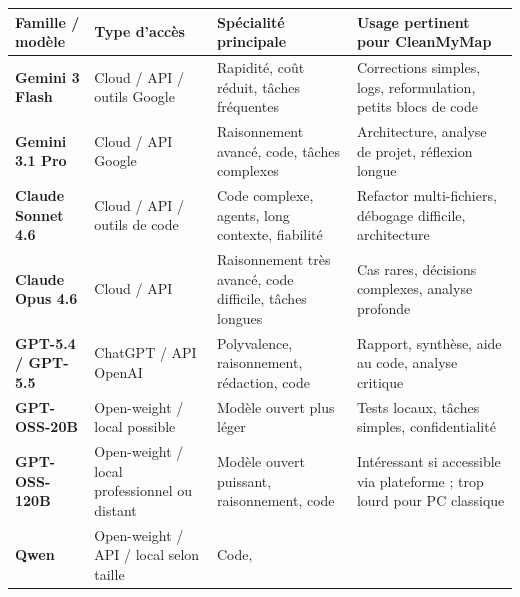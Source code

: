 \documentclass[
  10pt,
  a4paper,
  DIV=11,
  numbers=noendperiod,
  oneside]{scrreprt}
\newcounter{none} %
\let\oldtextbf\textbf
\renewcommand{\textbf}[1]{\oldtextbf{\textcolor{cmmnavy}{#1}}}
\begin{document}
{\def\LTcaptype{none} %
\begin{longtable}[]{@{}
  >{\raggedright\arraybackslash}p{}
  >{\raggedright\arraybackslash}p{}
  >{\raggedright\arraybackslash}p{}
  >{\raggedright\arraybackslash}p{}@{}}
\toprule\noalign{}
\begin{minipage}[b]{\linewidth}\raggedright
Famille / modèle
\end{minipage} & \begin{minipage}[b]{\linewidth}\raggedright
Type d'accès
\end{minipage} & \begin{minipage}[b]{\linewidth}\raggedright
Spécialité principale
\end{minipage} & \begin{minipage}[b]{\linewidth}\raggedright
Usage pertinent pour CleanMyMap
\end{minipage} \\
\midrule\noalign{}
\endhead
\bottomrule\noalign{}
\endlastfoot
\textbf{Gemini 3 Flash} & Cloud / API / outils Google & Rapidité, coût
réduit, tâches fréquentes & Corrections simples, logs, reformulation,
petits blocs de code \\
\textbf{Gemini 3.1 Pro} & Cloud / API Google & Raisonnement avancé,
code, tâches complexes & Architecture, analyse de projet, réflexion
longue \\
\textbf{Claude Sonnet 4.6} & Cloud / API / outils de code & Code
complexe, agents, long contexte, fiabilité & Refactor multi-fichiers,
débogage difficile, architecture \\
\textbf{Claude Opus 4.6} & Cloud / API & Raisonnement très avancé, code
difficile, tâches longues & Cas rares, décisions complexes, analyse
profonde \\
\textbf{GPT-5.4 / GPT-5.5} & ChatGPT / API OpenAI & Polyvalence,
raisonnement, rédaction, code & Rapport, synthèse, aide au code, analyse
critique \\
\textbf{GPT-OSS-20B} & Open-weight / local possible & Modèle ouvert plus
léger & Tests locaux, tâches simples, confidentialité \\
\textbf{GPT-OSS-120B} & Open-weight / local professionnel ou distant &
Modèle ouvert puissant, raisonnement, code & Intéressant si accessible
via plateforme ; trop lourd pour PC classique \\
\textbf{Qwen} & Open-weight / API / local selon taille & Code,

\end{longtable}}
\end{document}
